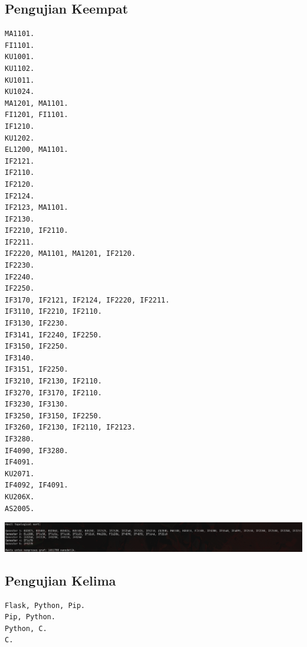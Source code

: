\documentclass{article}
\let\origfigure\figure
\let\endorigfigure\endfigure
\renewenvironment{figure}[1][2] {
    \expandafter\origfigure\expandafter[H]
} {
    \endorigfigure
}
\begin{document}
\subsection{Pengujian Keempat}
\begin{lstlisting}[caption = \textit{input}]
MA1101.
FI1101.
KU1001.
KU1102.
KU1011.
KU1024.
MA1201, MA1101.
FI1201, FI1101.
IF1210.
KU1202.
EL1200, MA1101.
IF2121.
IF2110.
IF2120.
IF2124.
IF2123, MA1101.
IF2130.
IF2210, IF2110.
IF2211.
IF2220, MA1101, MA1201, IF2120.
IF2230.
IF2240.
IF2250.
IF3170, IF2121, IF2124, IF2220, IF2211.
IF3110, IF2210, IF2110.
IF3130, IF2230.
IF3141, IF2240, IF2250.
IF3150, IF2250.
IF3140.
IF3151, IF2250.
IF3210, IF2130, IF2110.
IF3270, IF3170, IF2110.
IF3230, IF3130.
IF3250, IF3150, IF2250.
IF3260, IF2130, IF2110, IF2123.
IF3280.
IF4090, IF3280.
IF4091.
KU2071.
IF4092, IF4091.
KU206X.
AS2005.
\end{lstlisting}


\begin{figure}
  \includegraphics[scale=0.25]{4.png}
  \caption{\textit{input}}
\end{figure}
\subsection{Pengujian Kelima}
\begin{lstlisting}[caption = \textit{input}]
Flask, Python, Pip.
Pip, Python.
Python, C.
C.
\end{lstlisting}

\end{document}
